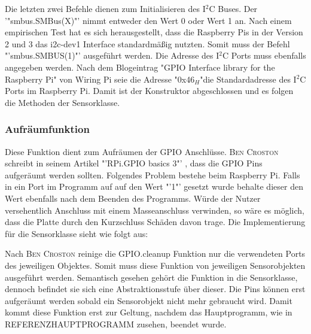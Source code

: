 	Die letzten zwei Befehle dienen zum Initialisieren des I$^2$C Buses. Der '"smbus.SMBus(X)"' nimmt entweder den Wert 0 oder Wert 1 an. Nach einem empirischen Test hat es sich herausgestellt, dass die Raspberry Pis in der Version 2 und 3 das i2c-dev1 Interface standardmäßig nutzten. Somit muss der Befehl "'smbus.SMBUS(1)"' ausgeführt werden. Die Adresse des I$^2$C Ports muss ebenfalls angegeben werden. Nach dem Blogeintrag "GPIO Interface library for the Raspberry Pi"\cite{I2CPCF8592:online} von Wiring Pi seie die Adresse "0x46$_H$"\space die Standardadresse des I$^2$C Ports im Raspberry Pi. Damit ist der Konstruktor abgeschlossen und es folgen die Methoden der Sensorklasse.
	
\subsubsection*{Aufräumfunktion}
	Diese Funktion dient zum Aufräumen der \ac{GPIO} Anschlüsse. \textsc{Ben Croston} schreibt in seinem Artikel "'RPi.GPIO basics 3"' \cite{RPiGPIOb90:online}, dass die \ac{GPIO} Pins aufgeräumt werden sollten. Folgendes Problem bestehe beim Raspberry Pi. Falls in ein Port im Programm auf auf den Wert "'1"' gesetzt wurde behalte dieser den Wert ebenfalls nach dem Beenden des Programms. Würde der Nutzer versehentlich Anschluss mit einem Masseanschluss verwinden, so wäre es möglich, dass die Platte durch den Kurzschluss Schäden davon trage. Die Implementierung für die Sensorklasse sieht wie folgt aus:
	
	Nach \textsc{Ben Croston} \cite{RPiGPIOb90:online} reinige die GPIO.cleanup Funktion nur die verwendeten Ports des jeweiligen Objektes. Somit muss diese Funktion von jeweiligen Sensorobjekten ausgeführt werden. Semantisch gesehen gehört die Funktion in die Sensorklasse, dennoch befindet sie sich eine Abstraktionsstufe über dieser. Die Pins können erst aufgeräumt werden sobald ein Sensorobjekt nicht mehr gebraucht wird. Damit kommt diese Funktion erst zur Geltung, nachdem das Hauptprogramm, wie in REFERENZHAUPTPROGRAMM zusehen,
	beendet wurde.
